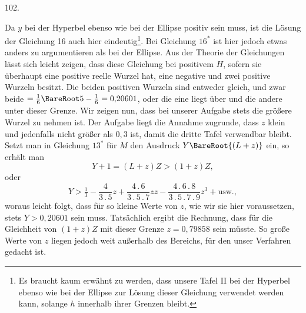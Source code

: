 \par{}\medskip
{}
\begin{center}102.\end{center}
Da $y$ bei der Hyperbel ebenso wie bei der Ellipse positiv sein muss, ist die Lösung der Gleichung 16 auch hier eindeutig\footnote{Es braucht kaum erwähnt zu werden, dass unsere Tafel II bei der Hyperbel ebenso wie bei der Ellipse zur Lösung dieser Gleichung verwendet werden kann, solange $h$ innerhalb ihrer Grenzen bleibt.}. Bei Gleichung $16^*$ ist hier jedoch etwas anders zu argumentieren als bei der Ellipse. Aus der Theorie der Gleichungen lässt sich leicht zeigen, dass diese Gleichung bei positivem $H$, sofern sie überhaupt eine positive reelle Wurzel hat, eine negative und zwei positive Wurzeln besitzt. Die beiden positiven Wurzeln sind entweder gleich, und zwar beide $=\tfrac16\BareRoot5-\tfrac16=0{,}20601$, oder die eine liegt über und die andere unter dieser Grenze. Wir zeigen nun, dass bei unserer Aufgabe stets die größere Wurzel zu nehmen ist. Der Aufgabe liegt die Annahme zugrunde, dass $z$ klein und jedenfalls nicht größer als $0{,}3$ ist, damit die dritte Tafel verwendbar bleibt. Setzt man in Gleichung $13^*$ für $M$ den Ausdruck $Y\BareRoot{(L+z)}$ ein, so erhält man
\[
Y+1=(L+z)Z>(1+z)Z,
\]
\noindent oder
\[
Y>\tfrac13-\frac4{3\mathpunct{.}5}z+\frac{4\mathpunct{.}6}{3\mathpunct{.}5\mathpunct{.}7}zz-\frac{4\mathpunct{.}6\mathpunct{.}8}{3\mathpunct{.}5\mathpunct{.}7\mathpunct{.}9}z^3+\text{usw.},
\]
\noindent woraus leicht folgt, dass für so kleine Werte von $z$, wie wir sie hier voraussetzen, stets $Y>0{,}20601$ sein muss. Tatsächlich ergibt die Rechnung, dass für die Gleichheit von $(1+z)Z$ mit dieser Grenze $z=0{,}79858$ sein müsste. So große Werte von $z$ liegen jedoch weit außerhalb des Bereichs, für den unser Verfahren gedacht ist.
